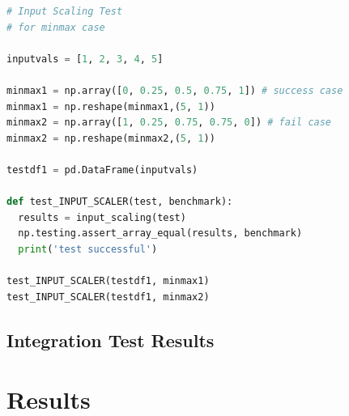 \documentclass[10pt,onecolumn,letterpaper]{article}
\begin{document}
\begin{lstlisting}[language=Python, breaklines=true, caption={Example of a \textit{numpy} comparison test.}]
# Input Scaling Test
# for minmax case

inputvals = [1, 2, 3, 4, 5]

minmax1 = np.array([0, 0.25, 0.5, 0.75, 1]) # success case
minmax1 = np.reshape(minmax1,(5, 1))
minmax2 = np.array([1, 0.25, 0.75, 0.75, 0]) # fail case
minmax2 = np.reshape(minmax2,(5, 1))

testdf1 = pd.DataFrame(inputvals)

def test_INPUT_SCALER(test, benchmark):
  results = input_scaling(test)
  np.testing.assert_array_equal(results, benchmark)
  print('test successful')

test_INPUT_SCALER(testdf1, minmax1)
test_INPUT_SCALER(testdf1, minmax2)
\end{lstlisting} 

\subsection{Integration Test Results} 


\newpage

\section{Results} \label{results}

\end{document}

